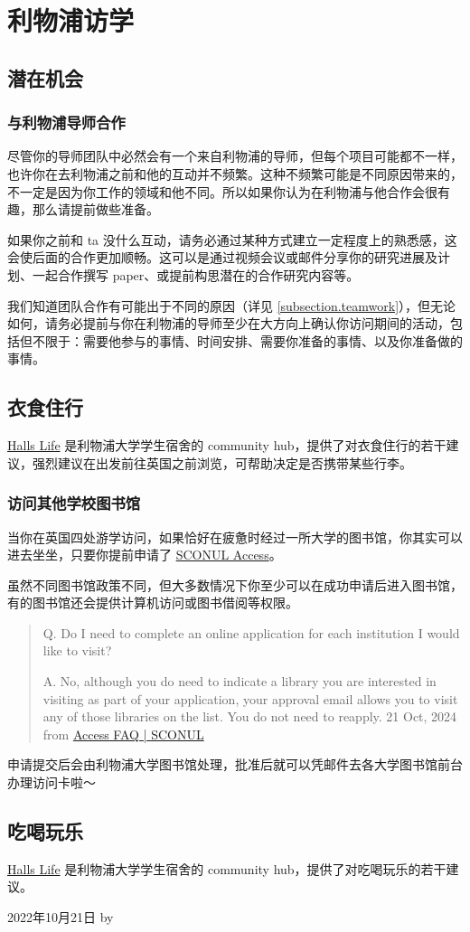 \section{利物浦访学}
\label{section.UoL_visit}

\subsection{潜在机会}
\subsubsection{与利物浦导师合作}
尽管你的导师团队中必然会有一个来自利物浦的导师，但每个项目可能都不一样，也许你在去利物浦之前和他的互动并不频繁。这种不频繁可能是不同原因带来的，不一定是因为你工作的领域和他不同。所以如果你认为在利物浦与他合作会很有趣，那么请提前做些准备。

如果你之前和 ta 没什么互动，请务必通过某种方式建立一定程度上的熟悉感，这会使后面的合作更加顺畅。这可以是通过视频会议或邮件分享你的研究进展及计划、一起合作撰写 paper、或提前构思潜在的合作研究内容等。

我们知道团队合作有可能出于不同的原因（详见 \ref{subsection.teamwork}），但无论如何，请务必提前与你在利物浦的导师至少在大方向上确认你访问期间的活动，包括但不限于：需要他参与的事情、时间安排、需要你准备的事情、以及你准备做的事情。


\subsection{衣食住行}
\href{https://hallslife.liverpool.ac.uk}{Halls Life} 是利物浦大学学生宿舍的 community hub，提供了对衣食住行的若干建议，强烈建议在出发前往英国之前浏览，可帮助决定是否携带某些行李。

\subsubsection{访问其他学校图书馆}
当你在英国四处游学访问，如果恰好在疲惫时经过一所大学的图书馆，你其实可以进去坐坐，只要你提前申请了 \href{https://access.sconul.ac.uk/sconul-access}{SCONUL Access}。

虽然不同图书馆政策不同，但大多数情况下你至少可以在成功申请后进入图书馆，有的图书馆还会提供计算机访问或图书借阅等权限。

\begin{quote}
    Q. Do I need to complete an online application for each institution I would like to visit?
    
    A. No, although you do need to indicate a library you are interested in visiting as part of your application, your approval email allows you to visit any of those libraries on the list. You do not need to reapply. \hfill 21 Oct, 2024 from \href{https://access.sconul.ac.uk/page/access-faq#Multiple%20applications}{Access FAQ | SCONUL}
\end{quote}

申请提交后会由利物浦大学图书馆处理，批准后就可以凭邮件去各大学图书馆前台办理访问卡啦～


\subsection{吃喝玩乐}
\href{https://hallslife.liverpool.ac.uk}{Halls Life} 是利物浦大学学生宿舍的 community hub，提供了对吃喝玩乐的若干建议。

\begin{flushright}
    2022年10月21日 by \Shiyao
\end{flushright}